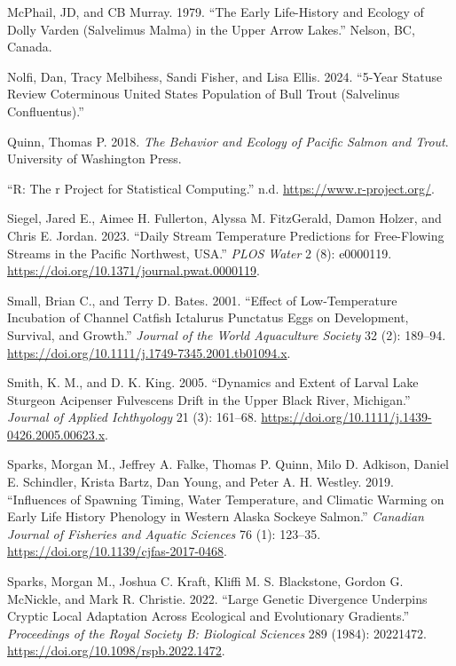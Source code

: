 \documentclass[webpdf,large,contemporary,namedate]{oup-authoring-template}
\newlength{\cslhangindent}
\newenvironment{CSLReferences}[2] %
 {\begin{list}{}{%
  \setlength{\itemindent}{0pt}
  \setlength{\leftmargin}{0pt}
  \setlength{\parsep}{0pt}
  \ifodd #1
   \setlength{\leftmargin}{\cslhangindent}
   \setlength{\itemindent}{-1\cslhangindent}
  \fi
  \setlength{\itemsep}{#2\baselineskip}}}
 {\end{list}}
\theoremstyle{thmstyleone}
\theoremstyle{thmstyletwo}
\theoremstyle{thmstylethree}
\begin{document}
\begin{CSLReferences}{1}{0}
McPhail, JD, and CB Murray. 1979. {``The Early Life-History and Ecology
of Dolly Varden (Salvelimus Malma) in the Upper Arrow Lakes.''} Nelson,
BC, Canada.

Nolfi, Dan, Tracy Melbihess, Sandi Fisher, and Lisa Ellis. 2024.
{``5-Year Statuse Review Coterminous United States Population of Bull
Trout (Salvelinus Confluentus).''}

Quinn, Thomas P. 2018. \emph{The Behavior and Ecology of Pacific Salmon
and Trout}. University of Washington Press.

{``R: The r Project for Statistical Computing.''} n.d.
\url{https://www.r-project.org/}.

Siegel, Jared E., Aimee H. Fullerton, Alyssa M. FitzGerald, Damon
Holzer, and Chris E. Jordan. 2023. {``Daily Stream Temperature
Predictions for Free-Flowing Streams in the Pacific Northwest, USA.''}
\emph{PLOS Water} 2 (8): e0000119.
\url{https://doi.org/10.1371/journal.pwat.0000119}.

Small, Brian C., and Terry D. Bates. 2001. {``Effect of Low-Temperature
Incubation of Channel Catfish Ictalurus Punctatus Eggs on Development,
Survival, and Growth.''} \emph{Journal of the World Aquaculture Society}
32 (2): 189--94.
\url{https://doi.org/10.1111/j.1749-7345.2001.tb01094.x}.

Smith, K. M., and D. K. King. 2005. {``Dynamics and Extent of Larval
Lake Sturgeon Acipenser Fulvescens Drift in the Upper Black River,
Michigan.''} \emph{Journal of Applied Ichthyology} 21 (3): 161--68.
\url{https://doi.org/10.1111/j.1439-0426.2005.00623.x}.

Sparks, Morgan M., Jeffrey A. Falke, Thomas P. Quinn, Milo D. Adkison,
Daniel E. Schindler, Krista Bartz, Dan Young, and Peter A. H. Westley.
2019. {``Influences of Spawning Timing, Water Temperature, and Climatic
Warming on Early Life History Phenology in Western Alaska Sockeye
Salmon.''} \emph{Canadian Journal of Fisheries and Aquatic Sciences} 76
(1): 123--35. \url{https://doi.org/10.1139/cjfas-2017-0468}.

Sparks, Morgan M., Joshua C. Kraft, Kliffi M. S. Blackstone, Gordon G.
McNickle, and Mark R. Christie. 2022. {``Large Genetic Divergence
Underpins Cryptic Local Adaptation Across Ecological and Evolutionary
Gradients.''} \emph{Proceedings of the Royal Society B: Biological
Sciences} 289 (1984): 20221472.
\url{https://doi.org/10.1098/rspb.2022.1472}.


\end{CSLReferences}
\end{document}
